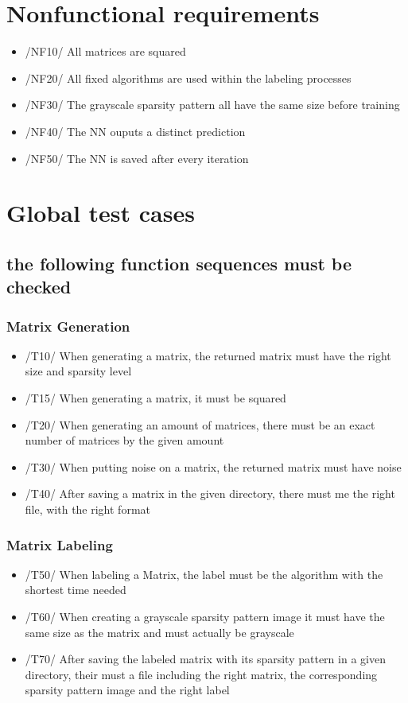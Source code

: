 \documentclass[parskip=full]{scrartcl}
\begin{document}
\section{Nonfunctional requirements}
	\begin{itemize}
		\item /NF10/ All matrices are squared
		\item /NF20/ All fixed algorithms are used within the labeling processes
		\item /NF30/ The grayscale sparsity pattern all have the same size before training
		\item /NF40/ The NN ouputs a distinct prediction
		\item /NF50/ The NN is saved after every iteration
	\end{itemize}
	

\section{Global test cases}
\subsection{the following function sequences must be checked}
	\subsubsection{Matrix Generation}
		\begin{itemize}
		\item /T10/ When generating a matrix, the returned matrix must have the right size and sparsity level
		\item /T15/ When generating a matrix, it must be squared
		\item /T20/ When generating an amount of matrices, there must be an exact number of matrices by the given amount
		\item /T30/ When putting noise on a matrix, the returned matrix must have noise
		\item /T40/ After saving a matrix in the given directory, there must me the right file, with the right format
		\end{itemize}
	\subsubsection{Matrix Labeling}
		\begin{itemize}
		\item /T50/ When labeling a Matrix, the label must be the algorithm with the shortest time needed
		\item /T60/ When creating a grayscale sparsity pattern image it must have the same size as
                       the matrix and must actually be grayscale
		\item /T70/ After saving the labeled matrix with its sparsity pattern in a given directory, their must a file including the right matrix, the corresponding sparsity pattern image and the right label
		\end{itemize}
\end{document}
